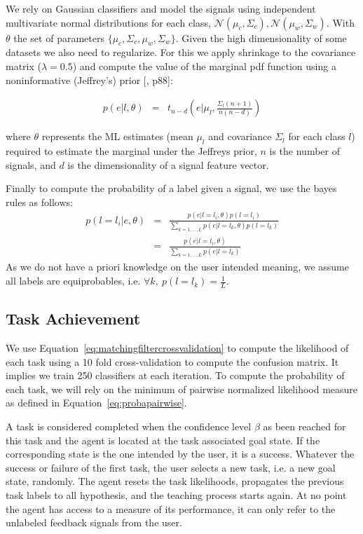 
We rely on Gaussian classifiers and model the signals using independent multivariate normal distributions for each class, $\mathcal{N}(\mu_c, \Sigma_c), \mathcal{N}(\mu_w, \Sigma_w)$. With $\theta$ the set of parameters $\{\mu_c, \Sigma_c,\mu_w, \Sigma_w\}$. Given the high dimensionality of some datasets we also need to regularize. For this we apply shrinkage to the covariance matrix ($\lambda = 0.5$) and compute the value of the marginal pdf function using a noninformative (Jeffrey's) prior [\cite{gelman2003bayesian}, p88]:

\begin{eqnarray}
p(e|l, \theta) & = & t_{n-d}(e | \mu_l,\frac{\Sigma_l (n+1)}{n(n-d)})
\label{eq:prior}
\end{eqnarray}

where $\theta$ represents the ML estimates (mean $\mu_l$ and covariance $\Sigma_l$ for each class $l$) required to estimate the marginal under the Jeffreys prior, $n$ is the number of signals, and $d$ is the dimensionality of a signal feature vector.

Finally to compute the probability of a label given a signal, we use the bayes rules as follows: 
%
\begin{eqnarray}
    p(l = l_i|e,\theta) &=& \frac{p(e|l = l_i, \theta)p(l = l_i)}{\sum_{k = 1,\ldots, L}{p(e|l = l_k,\theta)p(l = l_k)}}\nonumber \\
    &=& \frac{p(e|l=l_i, \theta)}{\sum_{k = 1,\ldots, L} p(e|l=l_k)} \nonumber
\end{eqnarray}
%
As we do not have a priori knowledge on the user intended meaning, we assume all labels are equiprobables, i.e. $\forall k,~p(l = l_k) = \frac{1}{L}$.

\subsection{Task Achievement}

We use Equation~\ref{eq:matchingfiltercrossvalidation} to compute the likelihood of each task using a 10 fold cross-validation to compute the confusion matrix. It implies we train 250 classifiers at each iteration. To compute the probability of each task, we will rely on the minimum of pairwise normalized likelihood measure as defined in Equation~\ref{eq:probapairwise}.

A task is considered completed when the confidence level $\beta$ as been reached for this task and the agent is located at the task associated goal state. If the corresponding state is the one intended by the user, it is a success. Whatever the success or failure of the first task, the user selects a new task, i.e. a new goal state, randomly. The agent resets the task likelihoods, propagates the previous task labels to all hypothesis, and the teaching process starts again. At no point the agent has access to a measure of its performance, it can only refer to the unlabeled feedback signals from the user.

